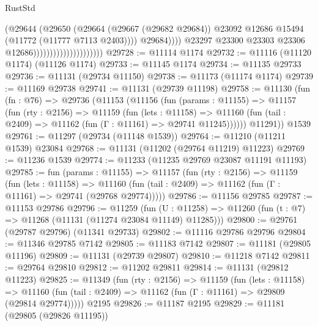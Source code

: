 \begin{lexlean}{RustStd}
\begin{coremodule}
                                                    (@29644
                                                      (@29650
                                                        (@29664
                                                          (@29667 (@29682 @29684))
                                                          @23092
                                                          @12686
                                                          @15494
                                                          (@11772 (@11777 @7113 @2403))))
                                                      @29684))))
                                              @23297
                                              @23300
                                              @23303
                                              @23306
                                              @12686)))))))))))))))))))))
@29728 := @11114 @1174
@29732 := @11116 (@11120 @1174) (@11126 @1174)
@29733 := @11145 @1174
@29734 := @11135 @29733
@29736 := @11131 (@29734 @11150)
@29738 := @11173 (@11174 @1174)
@29739 := @11169 @29738
@29741 := @11131 (@29739 @11198)
@29758 := @11130
    (fun (fn : @76) =>
    @29736
      (@11153
        (@11156
          (fun (params : @11155) =>
          @11157
            (fun (rty : @2156) =>
            @11159
              (fun (lets : @11158) =>
              @11160 (fun (tail : @2409) => @11162 (fun (Γ : @11161) => @29741 @11245))))))
        @11291))
    @1539
@29761 := @11297 (@29734 (@11148 @1539))
@29764 := @11210 (@11211 @1539) @23084
@29768 := @11131 (@11202 (@29764 @11219) @11223)
@29769 := @11236 @1539
@29774 := @11233 (@11235 @29769 @23087 @11191 @11193)
@29785 := fun (params : @11155) =>
  @11157
    (fun (rty : @2156) =>
    @11159
      (fun (lets : @11158) =>
      @11160 (fun (tail : @2409) => @11162 (fun (Γ : @11161) => @29741 (@29768 @29774)))))
@29786 := @11156 @29785
@29787 := @11153 @29786
@29796 := @11259
    (fun (U : @11258) => @11260 (fun (t : @7) => @11268 (@11131 (@11274 @23084 @11149) @11285)))
@29800 := @29761 (@29787 @29796) (@11341 @29733)
@29802 := @11116 @29786 @29796
@29804 := @11346 @29785 @7142
@29805 := @11183 @7142
@29807 := @11181 (@29805 @11196)
@29809 := @11131 (@29739 @29807)
@29810 := @11218 @7142
@29811 := @29764 @29810
@29812 := @11202 @29811
@29814 := @11131 (@29812 @11223)
@29825 := @11349
    (fun (rty : @2156) =>
    @11159
      (fun (lets : @11158) =>
      @11160 (fun (tail : @2409) => @11162 (fun (Γ : @11161) => @29809 (@29814 @29774)))))
    @2195
@29826 := @11187 @2195
@29829 := @11181 (@29805 (@29826 @11195))

\end{coremodule}
\end{lexlean}
